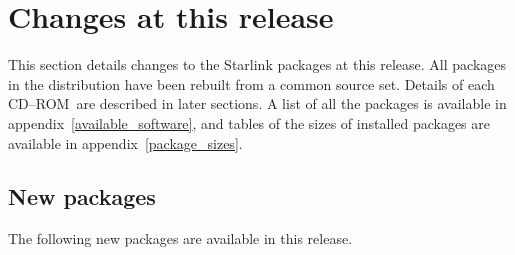 \documentclass[twoside,11pt]{article}
\newcommand{\xlabel}[1]{}
\renewcommand{\_}{\texttt{\symbol{95}}}
\newcommand{\cdrom}{CD--ROM}
\newcommand{\cdrom}{CD-ROM}
\begin{document}
\newpage
\section{\xlabel{changes_this_release}Changes at this release}
\label{changes_this_release}

This section details changes to the Starlink packages at this release.
All packages in the distribution have been rebuilt from a common source set.
Details of each \cdrom\ are described in later sections.  A list of all
the packages is available in appendix~\ref{available_software}, and tables
of the sizes of installed packages are available in
appendix~\ref{package_sizes}.

\subsection{\xlabel{new_packages}New packages}
\label{new_packages}

The following new packages are available in this release.
\end{document}
